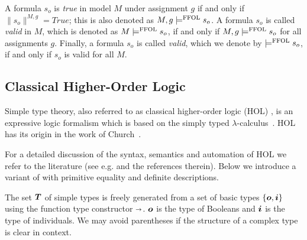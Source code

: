 \begin{defn}[Validity]\label{ffollvalid}
  A formula $s_o$ is \emph{true} in model $M$ under assignment $g$ if and only if
  $\|s_o\|^{M,g} = True$; this is also denoted as $M,g \models^{\text{\textrm{FFOL}}} s_o$.  A
  formula $s_o$ is called \emph{valid} in $M$, which is denoted as
  $M \models^{\text{\textrm{FFOL}}} s_o$, if and only if $M,g \models^{\text{\textrm{FFOL}}} s_o$ for all assignments
  $g$. Finally, a formula $s_o$ is called \emph{valid}, which we
  denote by $\models^{\text{\textrm{FFOL}}} s_o$, if and only if $s_o$ is valid for all
  $M$. 
\end{defn}


\subsection{Classical Higher-Order Logic}
Simple type theory, also referred to as classical higher-order logic
(HOL) \cite{AndrewsSEP}, is an expressive logic formalism which is based on the simply typed
$\lambda$-calculus~\cite{barendregt13book}. 
  HOL has its origin in the work of
  Church~\cite{Church40}.

For a detailed discussion of the syntax, semantics and automation
of  HOL we refer to the literature (see e.g.
\cite{AndrewsSEP,B5,J6} and the
references therein). Below we introduce a variant of \HOL with primitive equality
and definite descriptions. 



\begin{defn}[Types]\label{holtypes}
  The set $\boldsymbol{T}$ of simple types is freely generated from a set of
  basic types $\{\boldsymbol{o}, \boldsymbol{i}\}$ using the function type
  constructor $\boldsymbol{\shortrightarrow}$. $\boldsymbol{o}$ is the type of Booleans and 
  $\boldsymbol{i}$ is the type of individuals. We
  may avoid parentheses if the structure of a complex type is clear in context.
\end{defn}

